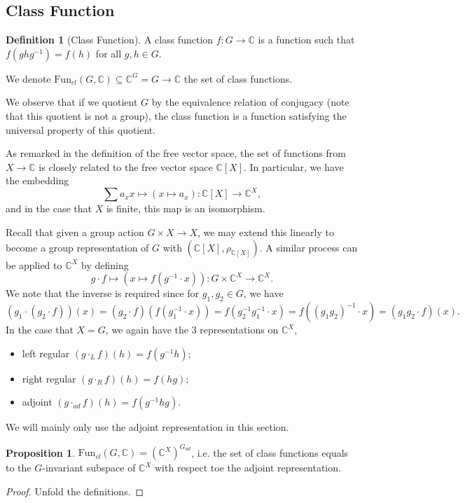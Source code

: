 \documentclass[]{article}
\theoremstyle{definition}
\theoremstyle{definition}
\newtheorem{definition}{Definition}[section]
\newtheorem{proposition}{Proposition}[section]
\begin{document}
\subsection{Class Function}

\begin{definition}[Class Function]
  A class function \(f : G \to \mathbb{C}\) is a function such that 
  \(f(ghg^{-1}) = f(h)\) for all \(g, h \in G\). 

  We denote \(\text{Fun}_{cl}(G, \mathbb{C}) \subseteq \mathbb{C}^G = 
    G \to \mathbb{C}\) the set of class functions.

  We observe that if we quotient \(G\) by the equivalence relation of conjugacy
  (note that this quotient is not a group), the class function is a function 
  satisfying the universal property of this quotient.
\end{definition}

As remarked in the definition of the free vector space, the set of functions 
from \(X \to \mathbb{C}\) is closely related to the free vector space 
\(\mathbb{C}[X]\). In particular, we have the embedding 
\[\sum a_x x \mapsto (x \mapsto a_x) : \mathbb{C}[X] \to \mathbb{C}^X,\]
and in the case that \(X\) is finite, this map is an isomorphism.

Recall that given a group action \(G \times X \to X\), we may extend this 
linearly to become a group representation of \(G\) with 
\((\mathbb{C}[X], \rho_{\mathbb{C}[X]})\). A similar process can be applied 
to \(\mathbb{C}^X\) by defining 
\[g \cdot f \mapsto (x \mapsto f(g^{-1} \cdot x)) : 
  G \times \mathbb{C}^X \to \mathbb{C}^X.\]
We note that the inverse is required since for \(g_1, g_2 \in G\), we have 
\[(g_1 \cdot (g_2 \cdot f))(x) = (g_2 \cdot f)(f(g_1^{-1} \cdot x)) = 
  f(g_2^{-1} g_1^{-1} \cdot x) = f((g_1 g_2)^{-1} \cdot x) = (g_1 g_2 \cdot f)(x).\]
In the case that \(X = G\), we again have the 3 representations on \(\mathbb{C}^X\),
\begin{itemize}
  \item left regular \((g \cdot_L f)(h) = f(g^{-1} h)\);
  \item right regular \((g \cdot_R f)(h) = f(hg)\);
  \item adjoint \((g \cdot_{ad} f)(h) = f(g^{-1} h g)\).
\end{itemize}
We will mainly only use the adjoint representation in this section. 

\begin{proposition}
  \(\text{Fun}_{cl}(G, \mathbb{C}) = (\mathbb{C}^X)^{G_{ad}}\), i.e. the set of 
  class functions equals to the \(G\)-invariant subspace of \(\mathbb{C}^X\) 
  with respect toe the adjoint representation.
\end{proposition}
\begin{proof}
  Unfold the definitions.
\end{proof}
\end{document}
